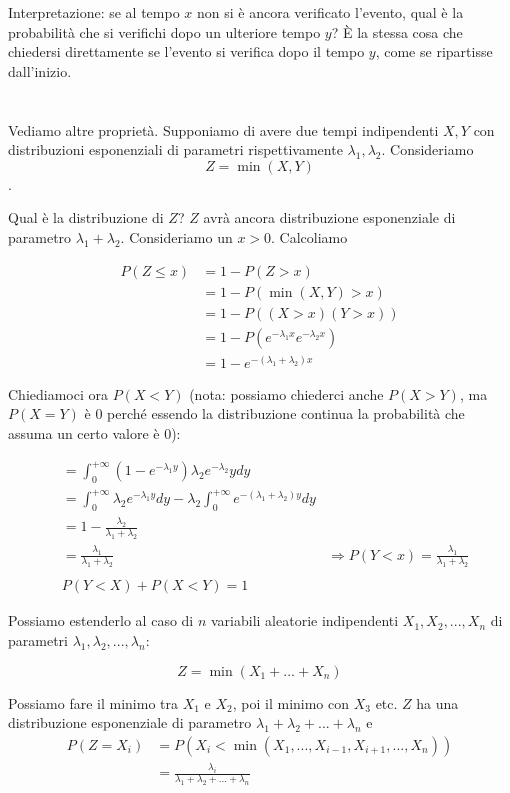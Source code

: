 \documentclass[a4paper,12pt]{book}
\begin{document}
Interpretazione: se al tempo $ x $ non si è ancora verificato l'evento, qual è la probabilità che si verifichi dopo un ulteriore tempo $ y $? È la stessa cosa che chiedersi direttamente se l'evento si verifica dopo il tempo $ y $, come se ripartisse dall'inizio. 
\\
\\
\\
Vediamo altre proprietà. Supponiamo di avere due tempi indipendenti $ X, Y $ con distribuzioni esponenziali di parametri rispettivamente $\lambda_1, \lambda_2$. Consideriamo
$$ Z = \min(X, Y) $$.

Qual è la distribuzione di $ Z $? $ Z $ avrà ancora distribuzione esponenziale di parametro $ \lambda_1 + \lambda_2 $. Consideriamo un $ x > 0 $. Calcoliamo

\begin{align*}
	P(Z \le x) & = 1 - P( Z > x) \\
	& = 1 - P(\min(X, Y) > x) \\
	& = 1 - P((X > x)(Y > x)) \\
	& = 1 - P(e^{-\lambda_1 x} e^{-\lambda_2 x}) \\
	& = 1 - e^{-(\lambda_1 + \lambda_2)x}
\end{align*}

Chiediamoci ora $ P(X < Y) $ (nota: possiamo chiederci anche $ P(X > Y) $, ma $ P(X=Y) $ è 0 perché essendo la distribuzione continua la probabilità che assuma un certo valore è 0):

\begin{align*}
	& = \int_{0}^{+\infty} (1- e^{-\lambda_1 y}) \lambda_2 e^{-\lambda_2}y dy \\
	& = \int_{0}^{+\infty} \lambda_2 e^{-\lambda_1 y} dy -\lambda_2 \int_{0}^{+\infty} e^{-(\lambda_1 + \lambda_2)y} dy \\
	& = 1 - \frac{\lambda_2}{\lambda_1 + \lambda_2} \\
	& = \frac{\lambda_1}{\lambda_1 + \lambda_2}
	& \Rightarrow P(Y < x) = \frac{\lambda_1}{\lambda_1 + \lambda_2}
	\\
	\\
	& P(Y < X) + P(X < Y) = 1 
\end{align*}

Possiamo estenderlo al caso di $ n $ variabili aleatorie indipendenti $ X_1, X_2, ..., X_n $ di parametri $ \lambda_1, \lambda_2, ..., \lambda_n $:

$$ Z = \min(X_1 + ... + X_n) $$

Possiamo fare il minimo tra $ X_1 $ e $ X_2 $, poi il minimo con $ X_3 $ etc. 
$ Z $ ha una distribuzione esponenziale di parametro $ \lambda_1 + \lambda_2 + ... + \lambda_n $ e 
\begin{align*}
	P(Z = X_i) & = P(X_i < \min(X_1, ..., X_{i-1}, X_{i+1}, ..., X_n)) \\
	& = \frac{\lambda_i}{\lambda_1 + \lambda_2 + ... + \lambda_n}
\end{align*}
\end{document}
